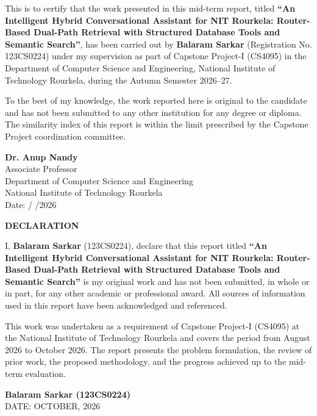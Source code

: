 \documentclass[12pt,a4paper]{report}
\begin{document}
This is to certify that the work presented in this mid-term report, titled \textbf{``An Intelligent Hybrid Conversational Assistant for NIT Rourkela: Router-Based Dual-Path Retrieval with Structured Database Tools and Semantic Search''}, has been carried out by \textbf{Balaram Sarkar} (Registration No. 123CS0224) under my supervision as part of Capstone Project-I (CS4095) in the Department of Computer Science and Engineering, National Institute of Technology Rourkela, during the Autumn Semester 2026--27.

To the best of my knowledge, the work reported here is original to the candidate and has not been submitted to any other institution for any degree or diploma. The similarity index of this report is within the limit prescribed by the Capstone Project coordination committee.

\vspace{3.5cm}
\begin{flushright}
    \textbf{Dr. Anup Nandy}\\
    Associate Professor\\
    Department of Computer Science and Engineering\\
    National Institute of Technology Rourkela\\[0.8cm]
    Date: \quad / \quad /2026
\end{flushright}

\newpage
\begin{center}
    {\Large \textbf{DECLARATION}}
\end{center}
\vspace{1.5cm}

I, \textbf{Balaram Sarkar} (123CS0224), declare that this report titled \textbf{``An Intelligent Hybrid Conversational Assistant for NIT Rourkela: Router-Based Dual-Path Retrieval with Structured Database Tools and Semantic Search''} is my original work and has not been submitted, in whole or in part, for any other academic or professional award. All sources of information used in this report have been acknowledged and referenced.

This work was undertaken as a requirement of Capstone Project-I (CS4095) at the National Institute of Technology Rourkela and covers the period from August 2026 to October 2026. The report presents the problem formulation, the review of prior work, the proposed methodology, and the progress achieved up to the mid-term evaluation.

\vspace{4cm}
\begin{flushright}
    \textbf{Balaram Sarkar (123CS0224)}\\[0.3cm]
    DATE: OCTOBER, 2026
\end{flushright}
\end{document}
